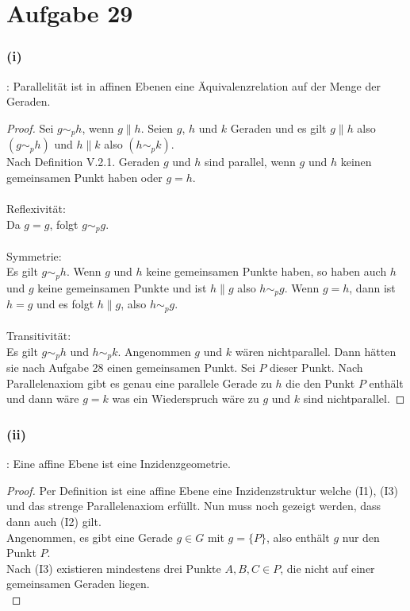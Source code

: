 \documentclass[12pt,a4paper]{article}
\newcommand{\zz}{\stackinset{c}{2.5pt}{c}{-2.5pt}{\textsf{Z}}{\textsf{Z}}}
\begin{document}
\newpage
\section*{Aufgabe 29}
\subsubsection*{(i)}
\zz: Parallelität ist in affinen Ebenen eine Äquivalenzrelation auf der Menge der Geraden. \\
\begin{proof} Sei $g \sim_p h$, wenn $g \parallel h$. Seien $g$, $h$ und $k$ Geraden und es gilt $g \parallel h$ also $(g \sim_p h)$ und $h \parallel k$ also $(h \sim_p k)$.  \\
Nach Definition V.2.1. Geraden $g$ und $h$ sind parallel, wenn $g$ und $h$ keinen gemeinsamen Punkt haben oder $g = h$. \\
\\
Reflexivität: \\
Da $g=g$, folgt $g \sim_p g$.\\
\\
Symmetrie: \\
Es gilt $g \sim_p h$. Wenn $g$ und $h$ keine gemeinsamen Punkte haben, so haben auch $h$ und $g$ keine gemeinsamen Punkte und ist $h \parallel g$ also $h \sim_p g$. Wenn $g=h$, dann ist $h=g$ und es folgt $h \parallel g$, also $h \sim_p g$.\\
\\
Transitivität:\\
Es gilt $g \sim_p h$ und $h \sim_p k$. Angenommen $g$ und $k$ wären nichtparallel. Dann hätten sie nach Aufgabe 28 einen gemeinsamen Punkt. Sei $P$ dieser Punkt. Nach Parallelenaxiom gibt es genau eine parallele Gerade zu $h$ die den Punkt $P$ enthält und dann wäre $g=k$ was ein Wiederspruch wäre zu $g$ und $k$ sind nichtparallel.
\end{proof}

\subsubsection*{(ii)}
\zz: Eine affine Ebene ist eine Inzidenzgeometrie.
\begin{proof}
Per Definition ist eine affine Ebene eine Inzidenzstruktur welche (I1), (I3) und das strenge Parallelenaxiom erfüllt. Nun muss noch gezeigt werden, dass dann auch (I2) gilt. \\
Angenommen, es gibt eine Gerade $g \in G$ mit $g = \{P\}$, also enthält $g$ nur den Punkt $P$.\\
Nach (I3) existieren mindestens drei Punkte $A, B, C \in P$, die nicht auf einer gemeinsamen Geraden liegen.\\

\end{proof}
\end{document}
